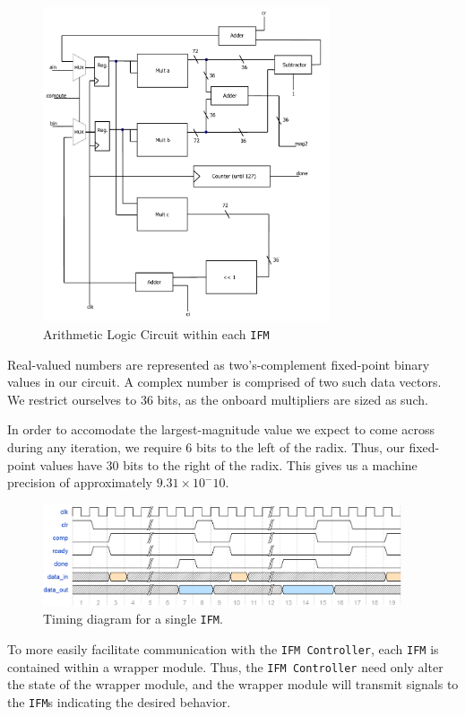 \documentclass{article}
\begin{document}
\begin{figure}[H]
  \centering
    \includegraphics[width=240pt]{block_diagrams/ifm.pdf}
  \caption{Arithmetic Logic Circuit within each \texttt{IFM}}
\end{figure}

Real-valued numbers are represented as two's-complement fixed-point binary
values in our circuit. A complex number is comprised of two such data vectors. 
We restrict ourselves to 36 bits, as the onboard multipliers
are sized as such. 

In order to accomodate the largest-magnitude value we
expect to come across during any iteration, we require 6 bits to the
left of the radix. Thus, our fixed-point values have 30 bits to the
right of the radix. This gives us a machine precision of approximately
$9.31 \times 10 ^ -10$.

\begin{figure}[H]
  \centering
    \includegraphics[width=300pt]{timing_diagrams/IFM.png}
  \caption{Timing diagram for a single \texttt{IFM}.}
\end{figure}


To more easily facilitate communication with the \texttt{IFM Controller}, each \texttt{IFM} is contained within a wrapper module.
Thus, the \texttt{IFM Controller} need only alter the state of the wrapper module, and the wrapper module will transmit signals to the \texttt{IFM}s indicating the desired behavior.
\end{document}
